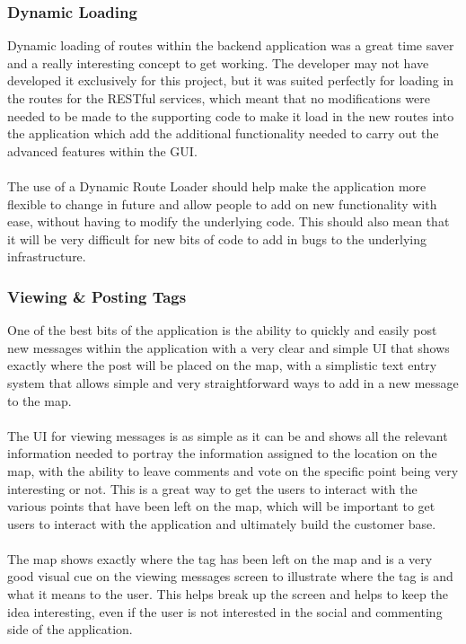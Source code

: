 \subsubsection{Dynamic Loading}

Dynamic loading of routes within the backend application was a great time saver and a really interesting concept to get working. The developer may not have developed it exclusively for this project, but it was suited perfectly for loading in the routes for the RESTful services, which meant that no modifications were needed to be made to the supporting code to make it load in the new routes into the application which add the additional functionality needed to carry out the advanced features within the GUI.\\
\\
The use of a Dynamic Route Loader should help make the application more flexible to change in future and allow people to add on new functionality with ease, without having to modify the underlying code. This should also mean that it will be very difficult for new bits of code to add in bugs to the underlying infrastructure.

\subsubsection{Viewing \& Posting Tags}
\label{sec:viewing_posting}

One of the best bits of the application is the ability to quickly and easily post new messages within the application with a very clear and simple UI that shows exactly where the post will be placed on the map, with a simplistic text entry system that allows simple and very straightforward ways to add in a new message to the map.\\
\\
The UI for viewing messages is as simple as it can be and shows all the relevant information needed to portray the information assigned to the location on the map, with the ability to leave comments and vote on the specific point being very interesting or not. This is a great way to get the users to interact with the various points that have been left on the map, which will be important to get users to interact with the application and ultimately build the customer base.\\
\\
The map shows exactly where the tag has been left on the map and is a very good visual cue on the viewing messages screen to illustrate where the tag is and what it means to the user. This helps break up the screen and helps to keep the idea interesting, even if the user is not interested in the social and commenting side of the application.

